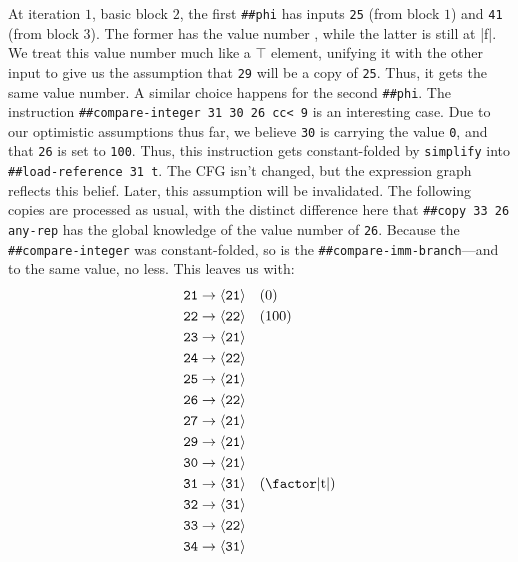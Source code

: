 At iteration $1$, basic block $2$, the first \Verb|##phi| has inputs
\Verb|25| (from block $1$) and \Verb|41| (from block $3$).  The former has
the value number , while the latter is still at \factor|f|.  We treat
this value number much like a $\top$ element, unifying it with the other input
to give us the assumption that \Verb|29| will be a copy of \Verb|25|.
Thus, it gets the same value number.  A similar choice happens for the second
\Verb|##phi|.  The instruction 
%
\Verb|##compare-integer 31 30 26 cc< 9|
%
is an interesting case.  Due to our optimistic assumptions thus far, we believe
\Verb|30| is carrying the value \Verb|0|, and that \Verb|26| is set to
\Verb|100|.  Thus, this instruction gets constant-folded by \Verb|simplify|
into
%
\Verb|##load-reference 31 t|.
%
The \gls{CFG} isn't changed, but the expression graph reflects this belief.
Later, this assumption will be invalidated.  The following copies are processed
as usual, with the distinct difference here that 
%
\Verb|##copy 33 26 any-rep|
%
has the global knowledge of the value number of \Verb|26|.  Because the
\Verb|##compare-integer| was constant-folded, so is the
\Verb|##compare-imm-branch|---and to the same value, no less.  This leaves us
with:
%
\begin{align*}
  \texttt{21} &\to \vn{21} \quad (0)                 \\
  \texttt{22} &\to \vn{22} \quad (100)               \\
  \texttt{23} &\to \vn{21}                           \\
  \texttt{24} &\to \vn{22}                           \\
  \texttt{25} &\to \vn{21}                           \\
  \texttt{26} &\to \vn{22}                           \\
  \texttt{27} &\to \vn{21}                           \\
  \texttt{29} &\to \vn{21}                           \\
  \texttt{30} &\to \vn{21}                           \\
  \texttt{31} &\to \vn{31} \quad (\text{\factor|t|}) \\
  \texttt{32} &\to \vn{31}                           \\
  \texttt{33} &\to \vn{22}                           \\
  \texttt{34} &\to \vn{31}
\end{align*}

